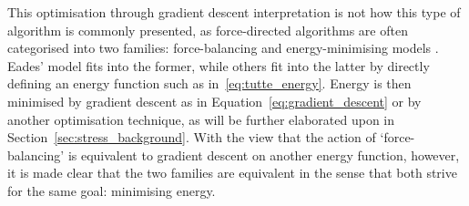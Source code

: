 This optimisation through gradient descent interpretation is not how this type of algorithm is commonly presented, as  force-directed algorithms are often categorised into two families: force-balancing and energy-minimising models \cite{Ortmann2017, Brandes2001Physical}.
Eades' model fits into the former, while others fit into the latter by directly defining an energy function such as in~\eqref{eq:tutte_energy}.
Energy is then minimised by gradient descent as in Equation~\eqref{eq:gradient_descent} or by another optimisation technique, as will be further elaborated upon in Section~\ref{sec:stress_background}.
With the view that the action of `force-balancing' is equivalent to gradient descent on another energy function, however, it is made clear that the two families are equivalent in the sense that both strive for the same goal: minimising energy.

